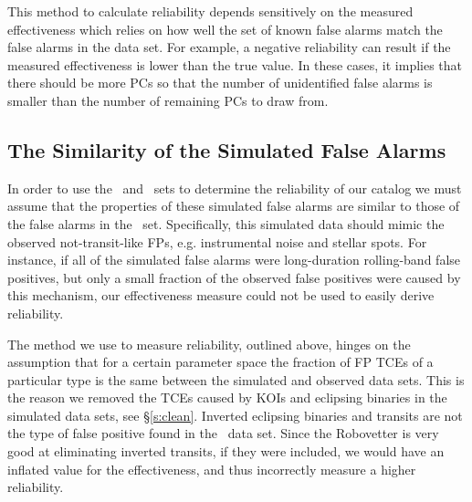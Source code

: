 This method to calculate reliability depends sensitively on the measured effectiveness which relies on how well the set of known false alarms match the false alarms in the \opstce{} data set. For example, a negative reliability can result if the measured effectiveness is lower than the true value. In these cases, it implies that there should be more PCs so that the number of unidentified false alarms is smaller than the number of remaining PCs to draw from.  


\subsection{The Similarity of the Simulated False Alarms}
\label{s:simularity}
In order to use the \scrtce\ and \invtce\ sets to determine the reliability of our catalog we must assume that the properties of these simulated false alarms are similar to those of the false alarms in the \opstce\ set.  Specifically, this simulated data should mimic the observed not-transit-like FPs, e.g. instrumental noise and stellar spots.  For instance, if all of the simulated false alarms were long-duration rolling-band false positives, but only a small fraction of the observed false positives were caused by this mechanism, our effectiveness measure could not be used to easily derive reliability.

The method we use to measure reliability, outlined above, hinges on the assumption that for a certain parameter space the fraction of FP TCEs of a particular type is the same between the simulated and observed data sets.  This is the reason we removed the TCEs caused by KOIs and eclipsing binaries in the simulated data sets, see \S\ref{s:clean}. Inverted eclipsing binaries and transits are not the type of false positive found in the \opstce\ data set.  Since the Robovetter is very good at eliminating inverted transits, if they were included, we would have an inflated value for the effectiveness, and thus incorrectly measure a higher reliability. 

